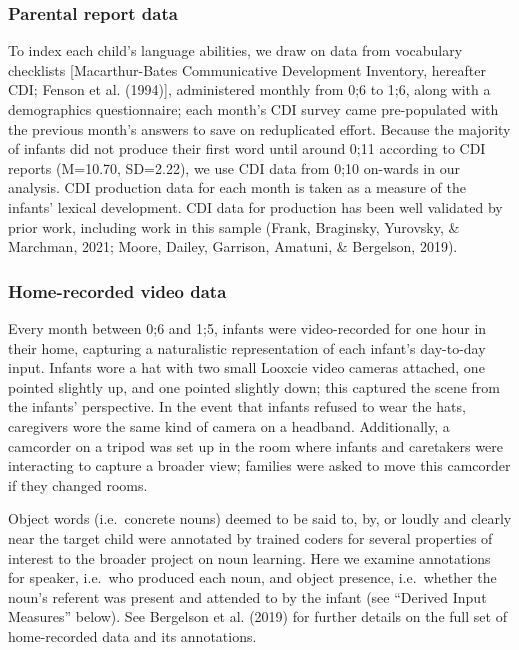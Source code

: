 \documentclass[
  english,
  man,floatsintext]{apa6}
\begin{document}
\hypertarget{parental-report-data}{%
\subsubsection{Parental report data}\label{parental-report-data}}

To index each child's language abilities, we draw on data from vocabulary checklists {[}Macarthur-Bates Communicative Development Inventory, hereafter CDI; Fenson et al. (1994){]}, administered monthly from 0;6 to 1;6, along with a demographics questionnaire; each month's CDI survey came pre-populated with the previous month's answers to save on reduplicated effort. Because the majority of infants did not produce their first word until around 0;11 according to CDI reports (M=10.70, SD=2.22), we use CDI data from 0;10 on-wards in our analysis. CDI production data for each month is taken as a measure of the infants' lexical development. CDI data for production has been well validated by prior work, including work in this sample (Frank, Braginsky, Yurovsky, \& Marchman, 2021; Moore, Dailey, Garrison, Amatuni, \& Bergelson, 2019).

\hypertarget{home-recorded-video-data}{%
\subsubsection{Home-recorded video data}\label{home-recorded-video-data}}

Every month between 0;6 and 1;5, infants were video-recorded for one hour in their home, capturing a naturalistic representation of each infant's day-to-day input. Infants wore a hat with two small Looxcie video cameras attached, one pointed slightly up, and one pointed slightly down; this captured the scene from the infants' perspective. In the event that infants refused to wear the hats, caregivers wore the same kind of camera on a headband. Additionally, a camcorder on a tripod was set up in the room where infants and caretakers were interacting to capture a broader view; families were asked to move this camcorder if they changed rooms.

Object words (i.e.~concrete nouns) deemed to be said to, by, or loudly and clearly near the target child were annotated by trained coders for several properties of interest to the broader project on noun learning. Here we examine annotations for speaker, i.e.~who produced each noun, and object presence, i.e.~whether the noun's referent was present and attended to by the infant (see ``Derived Input Measures'' below). See Bergelson et al. (2019) for further details on the full set of home-recorded data and its annotations.
\end{document}

